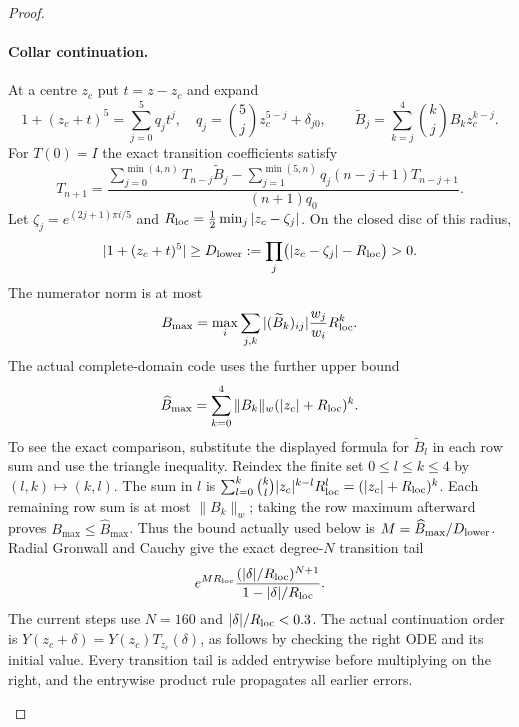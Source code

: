 \documentclass[11pt,a4paper]{article}
\theoremstyle{definition}
\begin{document}
\begin{proof}
\begin{enumerate}[label=\arabic*.]
\paragraph{Collar continuation.}
At a centre $z_c$ put $t=z-z_c$ and expand
\[
 1+(z_c+t)^5=\sum_{j=0}^5q_jt^j,
 \quad q_j=\binom5jz_c^{5-j}+\delta_{j0},
 \qquad
 \widetilde B_j=\sum_{k=j}^4\binom kjB_kz_c^{k-j}.
\]
For $T(0)=I$ the exact transition coefficients satisfy
\[
 T_{n+1}=
 \frac{\displaystyle
   \sum_{j=0}^{\min(4,n)}T_{n-j}\widetilde B_j
  -\sum_{j=1}^{\min(5,n)}q_j(n-j+1)T_{n-j+1}}
 {(n+1)q_0}.
\]
Let $\zeta_j=e^{(2j+1)\pi i/5}$ and
$R_{\rm loc}=\tfrac12\min_j|z_c-\zeta_j|$. On the closed disc
of this radius,
\[
 |1+(z_c+t)^5|\ge D_{\rm lower}
   :=\prod_j\bigl(|z_c-\zeta_j|-R_{\rm loc}\bigr)>0.
\]
The numerator norm is at most
\[
 B_{\max}=\max_i\sum_{j,k}|(\widetilde B_k)_{ij}|
                  \frac{w_j}{w_i}R_{\rm loc}^k.
\]
The actual complete-domain code uses the further upper bound
\[
 \widehat B_{\max}=\sum_{k=0}^4\|B_k\|_w
                           (|z_c|+R_{\rm loc})^k.
\]
To see the exact comparison, substitute the displayed formula for
$\widetilde B_l$ in each row sum and use the triangle inequality.
Reindex the finite set $0\le l\le k\le4$ by $(l,k)\mapsto(k,l)$.
The sum in $l$ is
$\sum_{l=0}^k\binom kl|z_c|^{k-l}R_{\rm loc}^l
=(|z_c|+R_{\rm loc})^k$.
Each remaining row sum is at most $\|B_k\|_w$; taking the row
maximum afterward proves $B_{\max}\le\widehat B_{\max}$.
Thus the bound actually used below is
$M=\widehat B_{\max}/D_{\rm lower}$. Radial Gronwall and Cauchy
give the exact degree-$N$ transition tail
\[
 e^{MR_{\rm loc}}
 \frac{(|\delta|/R_{\rm loc})^{N+1}}
      {1-|\delta|/R_{\rm loc}}.
\]
The current steps use $N=160$ and
$|\delta|/R_{\rm loc}<0.3$. The actual continuation order is
$Y(z_c+\delta)=Y(z_c)T_{z_c}(\delta)$, as follows by checking
the right ODE and its initial value. Every transition tail is
added entrywise before multiplying on the right, and the
entrywise product rule propagates all earlier errors.


\end{enumerate}
\end{proof}
\end{document}
